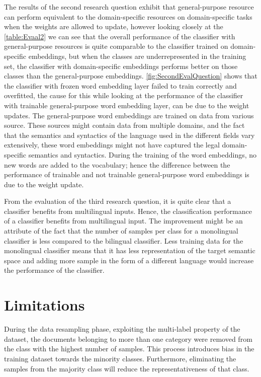 The results of the second research question exhibit that general-purpose resource can perform equivalent to the domain-specific resources on domain-specific tasks when the weights are allowed to update, however looking closely at the \ref{table:Evaal2} we can see that the overall performance of the classifier with general-purpose resources is quite comparable to the classifier trained on domain-specific embeddings, but when the classes are underrepresented in the training set, the classifier with domain-specific embeddings performs better on those classes than the general-purpose embeddings. \ref{fig:SecondEvalQuestion} shows that the classifier with frozen word embedding layer failed to train correctly and overfitted, the cause for this while looking at the performance of the classifier with trainable general-purpose word embedding layer, can be due to the weight updates. The general-purpose word embeddings are trained on data from various source. These sources might contain data from multiple domains, and the fact that the semantics and syntactics of the language used in the different fields vary extensively, these word embeddings might not have captured the legal domain-specific semantics and syntactics. During the training of the word embeddings, no new words are added to the vocabulary; hence the difference between the performance of trainable and not trainable general-purpose word embeddings is due to the weight update.


From the evaluation of the third research question, it is quite clear that a classifier benefits from multilingual inputs. Hence, the classification performance of a classifier benefits from multilingual input.  The improvement might be an attribute of the fact that the number of samples per class for a monolingual classifier is less compared to the bilingual classifier. Less training data for the monolingual classifier means that it has less representation of the target semantic space and adding more sample in the form of a different language would increase the performance of the classifier.


\section{Limitations}\label{sec:limitations}

During the data resampling phase, exploiting the multi-label property of the dataset, the documents belonging to more than one category were removed from the class with the highest number of samples.  This process introduces bias in the training dataset towards the minority classes. Furthermore, eliminating the samples from the majority class will reduce the representativeness of that class.  

